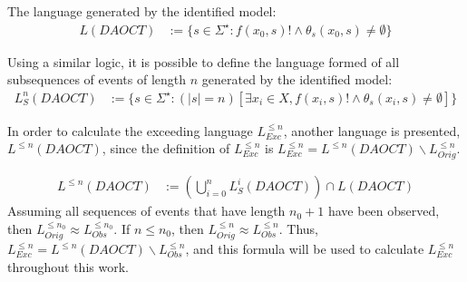 The language generated by the identified model:
\begin{align}
  L(DAOCT)&:=\{s \in \Sigma^\star : f(x_0,s)! \wedge \theta_s(x_0,s)\neq \emptyset \}
\end{align}

Using a similar logic, it is possible to define the language formed of all
subsequences of events of length $n$ generated by the identified model:
\begin{align}
  L_S^n(DAOCT)&:=\{s \in \Sigma^\star : (|s| = n)\left[\exists x_i \in X,f(x_i,s)! \wedge \theta_s(x_i,s)\neq \emptyset \right]\}
\end{align}

In order to calculate the exceeding language $L_{Exc}^{\leq n}$, another
language is presented, $L^{\leq n}(DAOCT)$, since the definition of
$L_{Exc}^{\leq n}$ is $L_{Exc}^{\leq n}=L^{\leq n}(DAOCT)\backslash
L_{Orig}^{\leq n}$.


\begin{align}
  L^{\leq n}(DAOCT)&:=\left( \bigcup_{i=0}^n L_S^i(DAOCT) \right)\cap L(DAOCT)
\end{align}
Assuming all sequences of events that have length $n_0+1$ have been
observed, then $L_{Orig}^{\leq n_0}\approx L_{Obs}^{\leq n_0}$. If $n\leq n_0$,
then $L_{Orig}^{\leq n}\approx L_{Obs}^{\leq n}$. Thus, $L_{Exc}^{\leq n}=L^{\leq n}(DAOCT)\backslash
L_{Obs}^{\leq n}$, and this formula will be used to calculate $L_{Exc}^{\leq n}$
throughout this work. 
